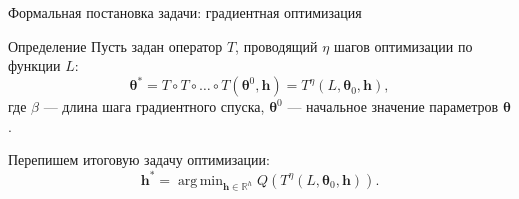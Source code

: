\documentclass[usenames,dvipsnames,10pt,pdf,utf8,russian,aspectratio=43]{beamer}
\DeclareMathOperator*{\argmin}{arg\,min}
\begin{document}
\begin{frame}{Формальная постановка задачи: градиентная оптимизация}
\begin{block}{Определение}
Пусть задан оператор $T$, проводящий $\eta$ шагов оптимизации по функции $L$:
\begin{equation}
\label{eq:gd}
	{\boldsymbol{\theta}}^{*} = T \circ T \circ \dots \circ T(\boldsymbol{\theta}^0, \mathbf{h}) = T^\eta(L, \boldsymbol{\theta}_0, \mathbf{h}),
\end{equation}
где 
$\beta$ --- длина шага градиентного спуска, $\boldsymbol{\theta}^0$ --- начальное значение параметров $\boldsymbol{\theta}$.
\end{block}


Перепишем итоговую задачу оптимизации:
\[
	\mathbf{h}^{*} = \argmin_{\mathbf{h} \in \mathbb{R}^h} Q( T^\eta(L, \boldsymbol{\theta}_0, \mathbf{h})).
\]



\end{frame}
\end{document}
